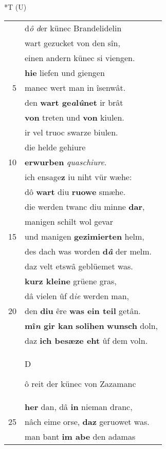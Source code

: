 \documentclass[8pt,a4paper,notitlepage]{article}
\begin{document}
\begin{table}[ht]
\begin{minipage}[t]{0.5\linewidth}
\end{minipage}
\hspace{0.5cm}
\begin{minipage}[t]{0.5\linewidth}
\small
\begin{center}*T (U)
\end{center}
\begin{tabular}{rl}
 & d\textit{ô} \textit{d}er künec Brandelidelin\\ 
 & wart gezucket von den sîn,\\ 
 & einen andern künec si viengen.\\ 
 & \textbf{hie} liefen und giengen\\ 
5 & manec wert man in îsenwât.\\ 
 & den \textbf{wart ge\textit{a}l\textit{û}net} ir brât\\ 
 & \textbf{von} treten und \textbf{von} kiulen.\\ 
 & ir vel truoc swarze biulen.\\ 
 & die helde gehiure\\ 
10 & \textbf{erwurben} \textit{quaschiure}.\\ 
 & ich ensage\textbf{z} iu niht vür wæhe:\\ 
 & dô \textbf{wart} diu \textbf{ruowe} smæhe.\\ 
 & die werden twanc diu minne \textbf{dar},\\ 
 & manigen schilt wol gevar\\ 
15 & und manigen \textbf{gezimierten} helm,\\ 
 & des dach was worden \textbf{d\textit{â}} der melm.\\ 
 & daz velt etswâ geblüemet was.\\ 
 & \textbf{kurz kleine} grüene gras,\\ 
 & dâ vielen ûf d\textit{ie} werden man,\\ 
20 & den \textbf{diu} êre \textbf{was ein teil} getân.\\ 
 & \textbf{mî\textit{n} gir kan} \textbf{solihen} \textbf{wunsch} doln,\\ 
 & daz \textbf{ich besæze eht} ûf dem voln.\\ 
 & \begin{large}D\end{large}ô reit der künec von Zazamanc\\ 
 & \textbf{her} dan, dâ \textbf{in} nieman dranc,\\ 
25 & nâch eime orse, \textbf{daz} geruowet was.\\ 
 & man bant \textbf{im abe} den adamas\\ 

\end{tabular}
\end{minipage}
\end{table}
\end{document}
